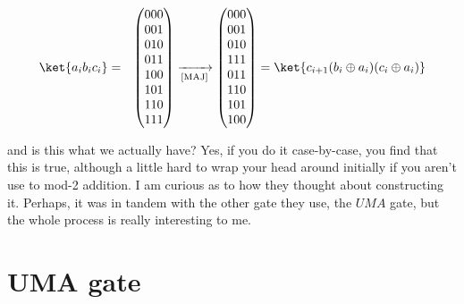 \documentclass[preprint,aps,prd,nofootinbib,superscriptaddress]{revtex4-2}
\begin{document}
\begin{eqnarray}
\ket{a_i b_i c_i} &=& 
\begin{pmatrix} 000 \\ 001 \\ 010 \\ 011 \\ 100 \\ 101 \\ 110 \\ 111 \end{pmatrix} 
\xrightarrow[\text{[MAJ]}]{} 
\begin{pmatrix} 000 \\ 001 \\ 010 \\ 111 \\ 011 \\ 110 \\ 101 \\ 100 \end{pmatrix}
= \ket{c_{i+1} (b_i\oplus a_i) (c_i\oplus a_i)}
\end{eqnarray}

and is this what we actually have? Yes, if you do it case-by-case, you find that this is true, although a little hard to wrap your head around initially if you aren't use to mod-2 addition. I am curious as to how they thought about constructing it. Perhaps, it was in tandem with the other gate they use, the $UMA$ gate, but the whole process is really interesting to me.


\section{UMA gate}
\end{document}
